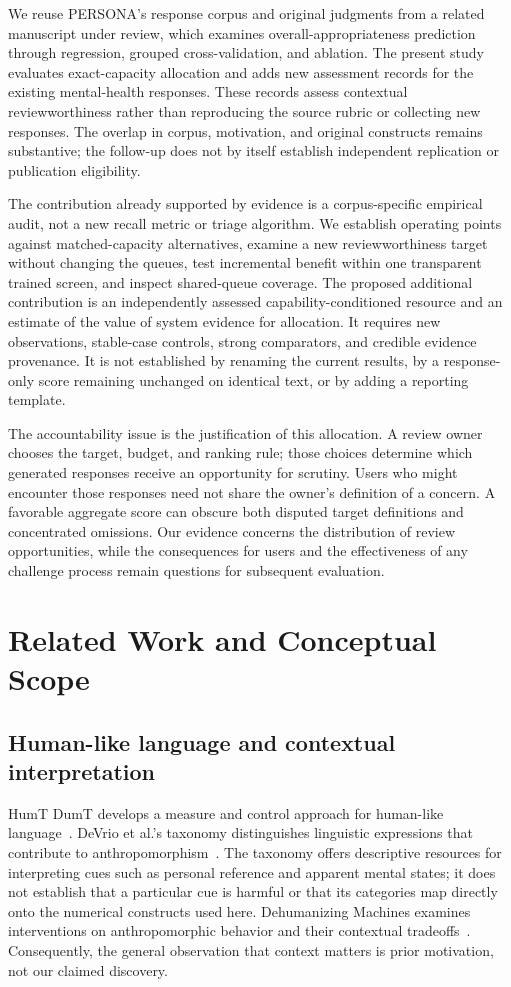 \documentclass[manuscript,screen,review,anonymous]{acmart}
\begin{document}
We reuse PERSONA's response corpus and original judgments from a related manuscript under review, which examines overall-appropriateness prediction through regression, grouped cross-validation, and ablation. The present study evaluates exact-capacity allocation and adds new assessment records for the existing mental-health responses. These records assess contextual reviewworthiness rather than reproducing the source rubric or collecting new responses. The overlap in corpus, motivation, and original constructs remains substantive; the follow-up does not by itself establish independent replication or publication eligibility.

The contribution already supported by evidence is a corpus-specific empirical audit, not a new recall metric or triage algorithm. We establish operating points against matched-capacity alternatives, examine a new reviewworthiness target without changing the queues, test incremental benefit within one transparent trained screen, and inspect shared-queue coverage. The proposed additional contribution is an independently assessed capability-conditioned resource and an estimate of the value of system evidence for allocation. It requires new observations, stable-case controls, strong comparators, and credible evidence provenance. It is not established by renaming the current results, by a response-only score remaining unchanged on identical text, or by adding a reporting template.

The accountability issue is the justification of this allocation. A review owner chooses the target, budget, and ranking rule; those choices determine which generated responses receive an opportunity for scrutiny. Users who might encounter those responses need not share the owner's definition of a concern. A favorable aggregate score can obscure both disputed target definitions and concentrated omissions. Our evidence concerns the distribution of review opportunities, while the consequences for users and the effectiveness of any challenge process remain questions for subsequent evaluation.

\section{Related Work and Conceptual Scope}
\subsection{Human-like language and contextual interpretation}
HumT DumT develops a measure and control approach for human-like language~\cite{cheng2025humt}. DeVrio et al.'s taxonomy distinguishes linguistic expressions that contribute to anthropomorphism~\cite{devrio2025taxonomy}. The taxonomy offers descriptive resources for interpreting cues such as personal reference and apparent mental states; it does not establish that a particular cue is harmful or that its categories map directly onto the numerical constructs used here. Dehumanizing Machines examines interventions on anthropomorphic behavior and their contextual tradeoffs~\cite{cheng2025dehumanizing}. Consequently, the general observation that context matters is prior motivation, not our claimed discovery.
\end{document}
